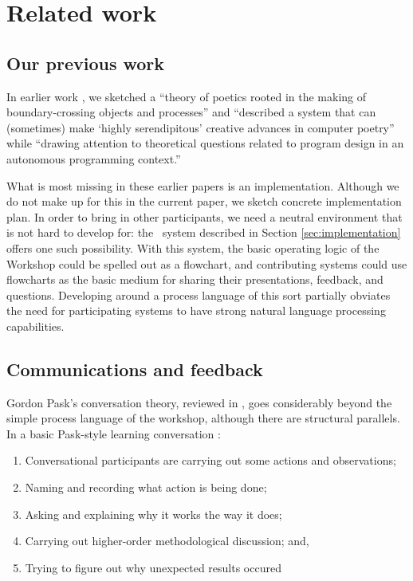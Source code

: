 \section{Related work}\label{sec:ww-model}

\subsection{Our previous work}

In earlier work \cite{corneli15iccc,corneli15cc}, we sketched a
``theory of poetics rooted in the making of boundary-crossing objects
and processes'' and ``described a system that can (sometimes) make
`highly serendipitous' creative advances in computer poetry'' while
``drawing attention to theoretical questions related to program design
in an autonomous programming context.''

What is most missing in these earlier papers is an implementation.
Although we do not make up for this in the current paper, we sketch
concrete implementation plan.  In order to bring in other
participants, we need a neutral environment that is not hard to
develop for: the \Fw\ system described in Section
\ref{sec:implementation} offers one such possibility.  With this
system, the basic operating logic of the Workshop could be spelled out
as a flowchart, and contributing systems could use flowcharts as the
basic medium for sharing their presentations, feedback, and questions.
Developing around a process language of this sort partially obviates
the need for participating systems to have strong natural language
processing capabilities.

\subsection{Communications and feedback}

Gordon Pask's conversation theory, reviewed in
\cite{conversation-theory-review,boyd2004conversation}, goes
considerably beyond the simple process language of the workshop,
although there are structural parallels.  In a basic Pask-style
learning conversation \cite[p. 190]{boyd2004conversation}: 

\begin{center}
\begin{fminipage}{.8\columnwidth}
\begin{minipage}{1\textwidth}
\begin{enumerate}[itemsep=0pt,rightmargin=10pt]
\item Conversational participants are carrying
out some actions and observations;
\item Naming and recording what action is being done;
\item Asking and explaining why it works the way
it does;
\item Carrying out higher-order methodological discussion; and, 
\item Trying to figure out why unexpected results occured
\end{enumerate}
\end{minipage}
\end{fminipage}
\end{center}


